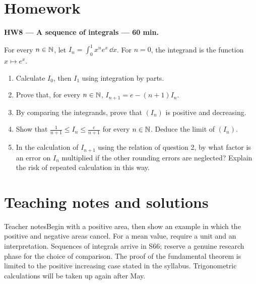 \section{Homework}\textbf{HW8 --- A sequence of integrals --- 60 min.}\par For every $n\in\mathbb N$, let $I_n=\displaystyle\int_0^1x^ne^x\,\dd x$. For $n=0$, the integrand is the function $x\mapsto e^x$.
\begin{enumerate}\item Calculate $I_0$, then $I_1$ using integration by parts.
\item Prove that, for every $n\in\mathbb N$, $I_{n+1}=e-(n+1)I_n$.
\item By comparing the integrands, prove that $(I_n)$ is positive and decreasing.
\item Show that $\frac1{n+1}\le I_n\le\frac e{n+1}$ for every $n\in\mathbb N$. Deduce the limit of $(I_n)$.
\item In the calculation of $I_{n+1}$ using the relation of question 2, by what factor is an error on $I_n$ multiplied if the other rounding errors are neglected? Explain the risk of repeated calculation in this way.\end{enumerate}

\ifprof\clearpage\section{Teaching notes and solutions}\begin{profbox}{Teacher notes}Begin with a positive area, then show an example in which the positive and negative areas cancel. For a mean value, require a unit and an interpretation. Sequences of integrals arrive in S66; reserve a genuine research phase for the choice of comparison. The proof of the fundamental theorem is limited to the positive increasing case stated in the syllabus. Trigonometric calculations will be taken up again after May.\end{profbox}

